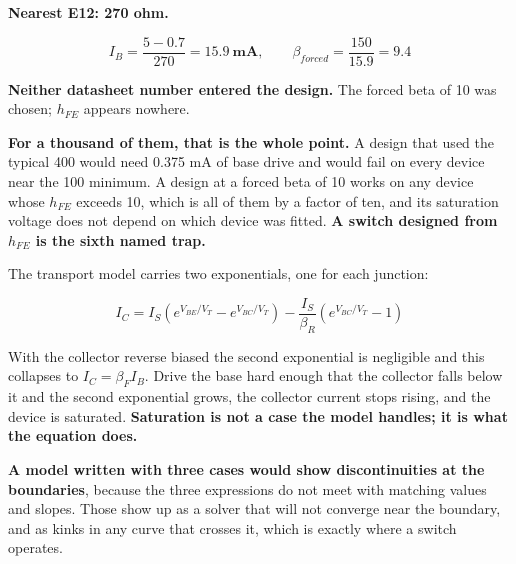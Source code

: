 \textbf{Nearest E12: 270 ohm.}

\[
  I_B = \frac{5 - 0.7}{270} = \mathbf{15.9\ \text{mA}}, \qquad
  \beta_{forced} = \frac{150}{15.9} = \mathbf{9.4}
\]

\textbf{Neither datasheet number entered the design.} The forced beta of 10 was chosen; $h_{FE}$ appears nowhere.

\textbf{For a thousand of them, that is the whole point.} A design that used the typical 400 would need 0.375 mA of base drive and would fail on every device near the 100 minimum. A design at a forced beta of 10 works on any device whose $h_{FE}$ exceeds 10, which is all of them by a factor of ten, and its saturation voltage does not depend on which device was fitted. \textbf{A switch designed from $h_{FE}$ is the sixth named trap.}


The transport model carries two exponentials, one for each junction:

\[
  I_C = I_S\left(e^{V_{BE}/V_T} - e^{V_{BC}/V_T}\right) - \frac{I_S}{\beta_R}\left(e^{V_{BC}/V_T}-1\right)
\]

With the collector reverse biased the second exponential is negligible and this collapses to $I_C = \beta_F I_B$. Drive the base hard enough that the collector falls below it and the second exponential grows, the collector current stops rising, and the device is saturated. \textbf{Saturation is not a case the model handles; it is what the equation does.}

\textbf{A model written with three cases would show discontinuities at the boundaries}, because the three expressions do not meet with matching values and slopes. Those show up as a solver that will not converge near the boundary, and as kinks in any curve that crosses it, which is exactly where a switch operates.



